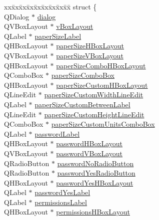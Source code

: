 \begin{CompactItemize}
\begin{tabbing}
\end{tabbing}\item 
\begin{tabbing}
xx\=xx\=xx\=xx\=xx\=xx\=xx\=xx\=xx\=\kill
struct \{\\
\>QDialog $\ast$ \hyperlink{classPDFOptions_r14}{dialog}\\
\>QVBoxLayout $\ast$ \hyperlink{classPDFOptions_r15}{vBoxLayout}\\
\>QLabel $\ast$ \hyperlink{classPDFOptions_r16}{paperSizeLabel}\\
\>QHBoxLayout $\ast$ \hyperlink{classPDFOptions_r17}{paperSizeHBoxLayout}\\
\>QVBoxLayout $\ast$ \hyperlink{classPDFOptions_r18}{paperSizeVBoxLayout}\\
\>QHBoxLayout $\ast$ \hyperlink{classPDFOptions_r19}{paperSizeComboHBoxLayout}\\
\>QComboBox $\ast$ \hyperlink{classPDFOptions_r20}{paperSizeComboBox}\\
\>QHBoxLayout $\ast$ \hyperlink{classPDFOptions_r21}{paperSizeCustomHBoxLayout}\\
\>QLineEdit $\ast$ \hyperlink{classPDFOptions_r22}{paperSizeCustomWidthLineEdit}\\
\>QLabel $\ast$ \hyperlink{classPDFOptions_r23}{paperSizeCustomBetweenLabel}\\
\>QLineEdit $\ast$ \hyperlink{classPDFOptions_r24}{paperSizeCustomHeightLineEdit}\\
\>QComboBox $\ast$ \hyperlink{classPDFOptions_r25}{paperSizeCustomUnitsComboBox}\\
\>QLabel $\ast$ \hyperlink{classPDFOptions_r26}{passwordLabel}\\
\>QHBoxLayout $\ast$ \hyperlink{classPDFOptions_r27}{passwordHBoxLayout}\\
\>QVBoxLayout $\ast$ \hyperlink{classPDFOptions_r28}{passwordVBoxLayout}\\
\>QRadioButton $\ast$ \hyperlink{classPDFOptions_r29}{passwordNoRadioButton}\\
\>QRadioButton $\ast$ \hyperlink{classPDFOptions_r30}{passwordYesRadioButton}\\
\>QHBoxLayout $\ast$ \hyperlink{classPDFOptions_r31}{passwordYesHBoxLayout}\\
\>QLabel $\ast$ \hyperlink{classPDFOptions_r32}{passwordYesLabel}\\
\>QLabel $\ast$ \hyperlink{classPDFOptions_r33}{permissionsLabel}\\
\>QHBoxLayout $\ast$ \hyperlink{classPDFOptions_r34}{permissionsHBoxLayout}\\

\end{tabbing}
\end{CompactItemize}
